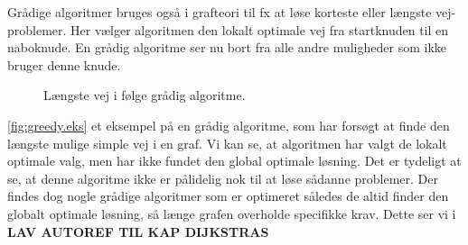 Grådige algoritmer bruges også i grafteori til fx at løse korteste eller længste vej-problemer. Her vælger algoritmen den lokalt optimale vej fra startknuden til en naboknude. En grådig algoritme ser nu bort fra alle andre muligheder som ikke bruger denne knude.

\begin{figure}[H]
\centering
	\caption{Længste vej i følge grådig algoritme.}
	\label{fig:greedy.eks}
\end{figure}

\autoref{fig:greedy.eks} et eksempel på en grådig algoritme, som har forsøgt at finde den længste mulige simple vej i en graf. Vi kan se, at algoritmen har valgt de lokalt optimale valg, men har ikke fundet den global optimale løsning. Det er tydeligt at se, at denne algoritme ikke er pålidelig nok til at løse sådanne problemer. Der findes dog nogle grådige algoritmer som er optimeret således de altid finder den globalt optimale løsning, så længe grafen overholde specifikke krav. Dette ser vi i \textbf{LAV AUTOREF TIL KAP DIJKSTRAS}

